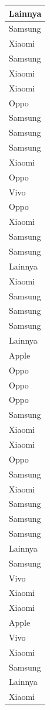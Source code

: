 \documentclass[
  letterpaper,
  DIV=11,
  numbers=noendperiod]{scrartcl}
\begin{document}
\begin{table}
\begin{tabular}[t]{l}
\hline
Lainnya\\
\hline
Samsung\\
\hline
Xiaomi\\
\hline
Samsung\\
\hline
Xiaomi\\
\hline
Xiaomi\\
\hline
Oppo\\
\hline
Samsung\\
\hline
Samsung\\
\hline
Samsung\\
\hline
Xiaomi\\
\hline
Oppo\\
\hline
Vivo\\
\hline
Oppo\\
\hline
Xiaomi\\
\hline
Samsung\\
\hline
Samsung\\
\hline
Lainnya\\
\hline
Xiaomi\\
\hline
Samsung\\
\hline
Samsung\\
\hline
Samsung\\
\hline
Lainnya\\
\hline
Apple\\
\hline
Oppo\\
\hline
Oppo\\
\hline
Oppo\\
\hline
Samsung\\
\hline
Xiaomi\\
\hline
Xiaomi\\
\hline
Oppo\\
\hline
Samsung\\
\hline
Xiaomi\\
\hline
Samsung\\
\hline
Samsung\\
\hline
Samsung\\
\hline
Lainnya\\
\hline
Samsung\\
\hline
Vivo\\
\hline
Xiaomi\\
\hline
Xiaomi\\
\hline
Apple\\
\hline
Vivo\\
\hline
Xiaomi\\
\hline
Samsung\\
\hline
Lainnya\\
\hline
Xiaomi\\

\end{tabular}
\end{table}
\end{document}
